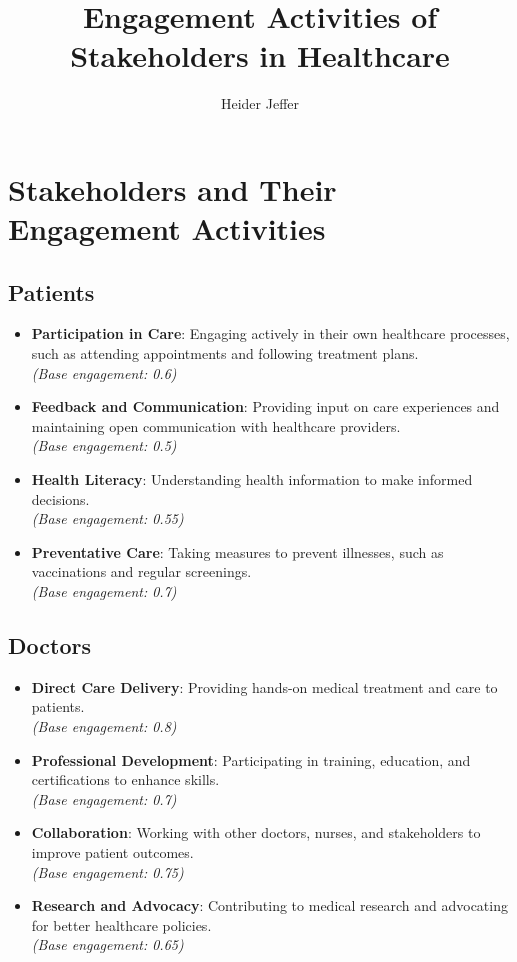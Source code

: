 \documentclass{article}
\title{\textbf{Engagement Activities of Stakeholders in Healthcare}}
\author{Heider Jeffer}
\date{}
\begin{document}
	
	\maketitle
	
	\section*{Stakeholders and Their Engagement Activities}
	
	\subsection*{Patients}
	\begin{itemize}[label=--]
		\item \textbf{Participation in Care}: Engaging actively in their own healthcare processes, such as attending appointments and following treatment plans. \\ \textit{(Base engagement: 0.6)}
		\item \textbf{Feedback and Communication}: Providing input on care experiences and maintaining open communication with healthcare providers. \\ \textit{(Base engagement: 0.5)}
		\item \textbf{Health Literacy}: Understanding health information to make informed decisions. \\ \textit{(Base engagement: 0.55)}
		\item \textbf{Preventative Care}: Taking measures to prevent illnesses, such as vaccinations and regular screenings. \\ \textit{(Base engagement: 0.7)}
	\end{itemize}
	
	\subsection*{Doctors}
	\begin{itemize}[label=--]
		\item \textbf{Direct Care Delivery}: Providing hands-on medical treatment and care to patients. \\ \textit{(Base engagement: 0.8)}
		\item \textbf{Professional Development}: Participating in training, education, and certifications to enhance skills. \\ \textit{(Base engagement: 0.7)}
		\item \textbf{Collaboration}: Working with other doctors, nurses, and stakeholders to improve patient outcomes. \\ \textit{(Base engagement: 0.75)}
		\item \textbf{Research and Advocacy}: Contributing to medical research and advocating for better healthcare policies. \\ \textit{(Base engagement: 0.65)}
	\end{itemize}
	
\end{document}
